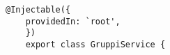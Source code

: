 \begin{lstlisting}[style = Java, caption = {Esempio di creazione di un servizio}]
@Injectable({
    providedIn: `root',
    })
    export class GruppiService {
\end{lstlisting}